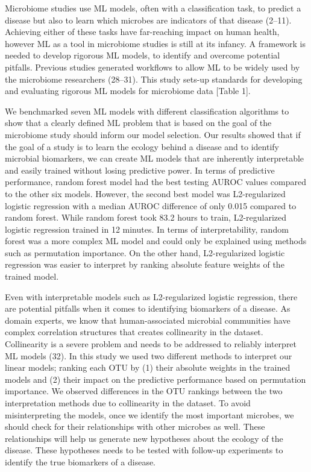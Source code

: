 \documentclass[11pt,]{article}
\begin{document}
Microbiome studies use ML models, often with a classification task, to
predict a disease but also to learn which microbes are indicators of
that disease (2--11). Achieving either of these tasks have far-reaching
impact on human health, however ML as a tool in microbiome studies is
still at its infancy. A framework is needed to develop rigorous ML
models, to identify and overcome potential pitfalls. Previous studies
generated workflows to allow ML to be widely used by the microbiome
researchers (28--31). This study sets-up standards for developing and
evaluating rigorous ML models for microbiome data {[}Table 1{]}.

We benchmarked seven ML models with different classification algorithms
to show that a clearly defined ML problem that is based on the goal of
the microbiome study should inform our model selection. Our results
showed that if the goal of a study is to learn the ecology behind a
disease and to identify microbial biomarkers, we can create ML models
that are inherently interpretable and easily trained without losing
predictive power. In terms of predictive performance, random forest
model had the best testing AUROC values compared to the other six
models. However, the second best model was L2-regularized logistic
regression with a median AUROC difference of only 0.015 compared to
random forest. While random forest took 83.2 hours to train,
L2-regularized logistic regression trained in 12 minutes. In terms of
interpretability, random forest was a more complex ML model and could
only be explained using methods such as permutation importance. On the
other hand, L2-regularized logistic regression was easier to interpret
by ranking absolute feature weights of the trained model.

Even with interpretable models such as L2-regularized logistic
regression, there are potential pitfalls when it comes to identifying
biomarkers of a disease. As domain experts, we know that
human-associated microbial communities have complex correlation
structures that creates collinearity in the dataset. Collinearity is a
severe problem and needs to be addressed to reliably interpret ML models
(32). In this study we used two different methods to interpret our
linear models; ranking each OTU by (1) their absolute weights in the
trained models and (2) their impact on the predictive performance based
on permutation importance. We observed differences in the OTU rankings
between the two interpretation methods due to collinearity in the
dataset. To avoid misinterpreting the models, once we identify the most
important microbes, we should check for their relationships with other
microbes as well. These relationships will help us generate new
hypotheses about the ecology of the disease. These hypotheses needs to
be tested with follow-up experiments to identify the true biomarkers of
a disease.
\end{document}
